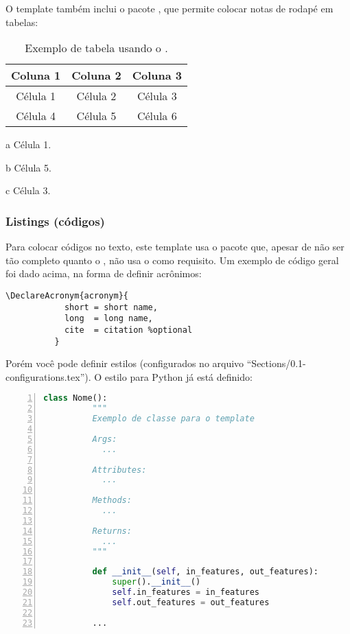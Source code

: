         O template também inclui o pacote , que permite colocar notas de rodapé em tabelas:
        \begin{table}[h!]
          \centering
          \caption{Exemplo de tabela usando o .}
          \label{tab:ex_5}
          \begin{threeparttable}
            \begin{tabular}{ccc}
              \toprule
              \textbf{Coluna 1} & \textbf{Coluna 2} & \textbf{Coluna 3} \\ \midrule
              Célula 1\tnote{a} & Célula 2          & Célula 3\tnote{c} \\ 
              Célula 4          & Célula 5\tnote{b} & Célula 6          \\ 
              \bottomrule
            \end{tabular}
            \begin{tablenotes}
              \item[a] Célula 1.
              \item[b] Célula 5.
              \item[c] Célula 3.
            \end{tablenotes}
          \end{threeparttable}
        \end{table}

      \subsubsection{Listings (códigos)}
        Para colocar códigos no texto, este template usa o pacote  que, apesar de não ser tão completo quanto o , não usa o  como requisito. Um exemplo de código geral foi dado acima, na forma de definir acrônimos:
        \begin{lstlisting}[autogobble]
          \DeclareAcronym{acronym}{
            short = short name,
            long  = long name,
            cite  = citation %optional
          }
        \end{lstlisting}

        Porém você pode definir estilos (configurados no arquivo ``Sections/0.1-configurations.tex''). O estilo para Python já está definido:
        \begin{lstlisting}[label=code:bnn_layer, language=Python, numbers=left]
          class Nome():
          """
          Exemplo de classe para o template
      
          Args:
            ...
      
          Attributes:
            ...
      
          Methods:
            ...
      
          Returns:
            ...
          """
      
          def __init__(self, in_features, out_features):
              super().__init__()
              self.in_features = in_features
              self.out_features = out_features

          ...
        \end{lstlisting}

